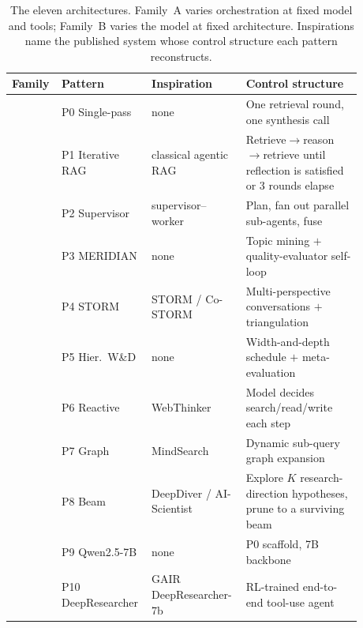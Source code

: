 \documentclass[11pt]{article}
\begin{document}
\begin{table}[t]\centering
\caption{The eleven architectures. Family~A varies orchestration at fixed model and
tools; Family~B varies the model at fixed architecture. Inspirations name the
published system whose control structure each pattern reconstructs.}
\label{tab:taxonomy}
\small
\begin{tabular}{p{0.10\linewidth} p{0.20\linewidth} p{0.26\linewidth} p{0.32\linewidth}}
\toprule
Family & Pattern & Inspiration & Control structure\\
\midrule
{}
 & P0 Single-pass    & none                         & One retrieval round, one synthesis call\\
 & P1 Iterative RAG  & classical agentic RAG       & Retrieve$\to$reason$\to$retrieve until reflection is satisfied or 3 rounds elapse\\
 & P2 Supervisor     & supervisor--worker          & Plan, fan out parallel sub-agents, fuse\\
 & P3 MERIDIAN       & none                         & Topic mining $+$ quality-evaluator self-loop\\
 & P4 STORM          & STORM / Co-STORM            & Multi-perspective conversations $+$ triangulation\\
 & P5 Hier.\ W\&D    & none                         & Width-and-depth schedule $+$ meta-evaluation\\
 & P6 Reactive       & WebThinker                  & Model decides search/read/write each step\\
 & P7 Graph          & MindSearch                  & Dynamic sub-query graph expansion\\
 & P8 Beam           & DeepDiver / AI-Scientist    & Explore $K$ research-direction hypotheses, prune to a surviving beam\\
\midrule
{}
 & P9 Qwen2.5-7B     & none                         & P0 scaffold, 7B backbone\\
 & P10 DeepResearcher& GAIR DeepResearcher-7b      & RL-trained end-to-end tool-use agent\\
\bottomrule
\end{tabular}
\end{table}
\end{document}
